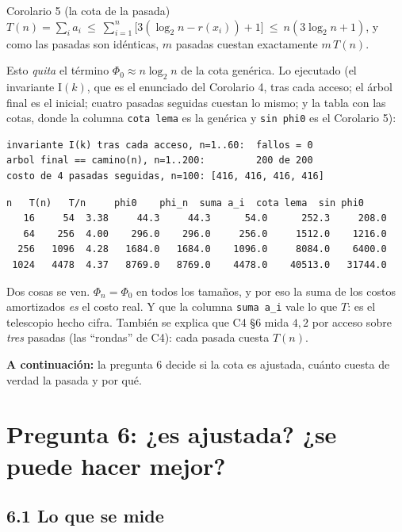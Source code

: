 \documentclass[11pt]{article}
\begin{document}
\begin{resultado}{Corolario 5 (la cota de la pasada)}
$T(n)=\sum_ia_i\ \le\ \sum_{i=1}^n\bigl[3(\log_2n-r(x_i))+1\bigr]\ \le\ n(3\log_2n+1)$, y como las pasadas son idénticas, $m$ pasadas cuestan exactamente $m\,T(n)$.
\end{resultado}
Esto \emph{quita} el término $\Phi_0\approx n\log_2n$ de la cota genérica. Lo ejecutado (el invariante $\mathrm{I}(k)$, que es el enunciado del Corolario 4, tras cada acceso; el árbol final es el inicial; cuatro pasadas seguidas cuestan lo mismo; y la tabla con
las cotas, donde la columna \texttt{cota lema} es la genérica y \texttt{sin phi0} es el Corolario 5):
\begin{lstlisting}[style=salida,basicstyle=\ttfamily\footnotesize\color{black},columns=fixed]
invariante I(k) tras cada acceso, n=1..60:  fallos = 0
arbol final == camino(n), n=1..200:         200 de 200
costo de 4 pasadas seguidas, n=100: [416, 416, 416, 416]
\end{lstlisting}
\begin{lstlisting}[style=salida,basicstyle=\ttfamily\footnotesize\color{black},columns=fixed]
    n   T(n)   T/n     phi0    phi_n  suma a_i  cota lema  sin phi0
   16     54  3.38     44.3     44.3      54.0      252.3     208.0
   64    256  4.00    296.0    296.0     256.0     1512.0    1216.0
  256   1096  4.28   1684.0   1684.0    1096.0     8084.0    6400.0
 1024   4478  4.37   8769.0   8769.0    4478.0    40513.0   31744.0
\end{lstlisting}
Dos cosas se ven. $\Phi_n=\Phi_0$ en todos los tamaños, y por eso la suma de los costos amortizados \emph{es} el costo real. Y que la columna
\texttt{suma a\_i} vale lo que $T$: es el telescopio hecho cifra. También se explica que C4 §6 mida $4{,}2$ por acceso sobre \emph{tres} pasadas (las ``rondas'' de C4): cada pasada
cuesta $T(n)$.

\textbf{A continuación:} la pregunta 6 decide si la cota es ajustada, cuánto cuesta de verdad la pasada y por qué.

\section{Pregunta 6: ¿es ajustada? ¿se puede hacer mejor?}

\subsection*{6.1 Lo que se mide}
\end{document}
